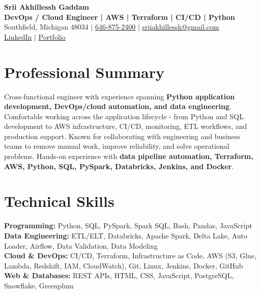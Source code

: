 \documentclass[letterpaper,10pt]{article}
\begin{document}
\fontsize{9.35pt}{10.45pt}\selectfont

\begin{center}
    {\LARGE \textbf{Srii Akhillessh Gaddam}} \\[-1pt]
    \textbf{DevOps / Cloud Engineer | AWS | Terraform | CI/CD | Python} \\[2pt]
    Southfield, Michigan 48034 $|$
    \href{tel:6468752400}{646-875-2400} $|$
    \href{mailto:sriiakhillessh@gmail.com}{sriiakhillessh@gmail.com} \\[1pt]
    \href{https://www.linkedin.com/in/srii-akhiilessh-gaddam-b48668191/}{LinkedIn} $|$
    \href{https://sriiakhillesshg.github.io/portfolio/}{Portfolio}
\end{center}
\vspace{-8pt}

\section{Professional Summary}
\small{Cross-functional engineer with experience spanning \textbf{Python application development, DevOps/cloud automation, and data engineering}. Comfortable working across the application lifecycle - from Python and SQL development to AWS infrastructure, CI/CD, monitoring, ETL workflows, and production support. Known for collaborating with engineering and business teams to remove manual work, improve reliability, and solve operational problems. Hands-on experience with \textbf{data pipeline automation, Terraform, AWS, Python, SQL, PySpark, Databricks, Jenkins, and Docker}.}

\section{Technical Skills}
\small{
\textbf{Programming:} Python, SQL, PySpark, Spark SQL, Bash, Pandas, JavaScript \\
\textbf{Data Engineering:} ETL/ELT, Databricks, Apache Spark, Delta Lake, Auto Loader, Airflow, Data Validation, Data Modeling \\
\textbf{Cloud \& DevOps:} CI/CD, Terraform, Infrastructure as Code, AWS (S3, Glue, Lambda, Redshift, IAM, CloudWatch), Git, Linux, Jenkins, Docker, GitHub \\
\textbf{Web \& Databases:} REST APIs, HTML, CSS, JavaScript, PostgreSQL, Snowflake, Greenplum
}
\end{document}
